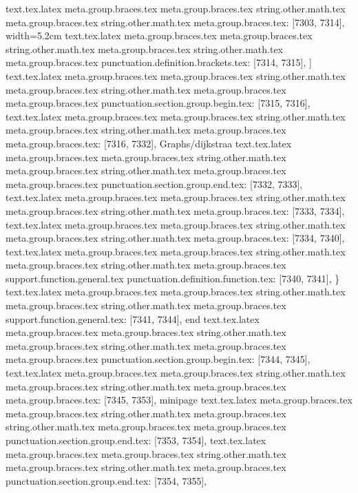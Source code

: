 {{{{{{{{{{{{{{{{{{{{{{{{{{{{{{{{{{{{{{{{{{{{{{{{{{{{{{{{{{{{{{{{{{{{{{{{{{{{{{{{{{{{{{{{{{{{{{{{{{{{{{{{{{{{{{{{{{{{{{{{{{{{{{{{{{{{{{{{{{{{{{{{{{{{{{{{{{{{{{{{{{{{{{{{{{{{{{{{{{{{{{{{{{{{{{{{{{{text.tex.latex meta.group.braces.tex meta.group.braces.tex string.other.math.tex meta.group.braces.tex string.other.math.tex meta.group.braces.tex: [7303, 7314], {width=5.2cm}
text.tex.latex meta.group.braces.tex meta.group.braces.tex string.other.math.tex meta.group.braces.tex string.other.math.tex meta.group.braces.tex punctuation.definition.brackets.tex: [7314, 7315], {]}
text.tex.latex meta.group.braces.tex meta.group.braces.tex string.other.math.tex meta.group.braces.tex string.other.math.tex meta.group.braces.tex meta.group.braces.tex punctuation.section.group.begin.tex: [7315, 7316], {{}
text.tex.latex meta.group.braces.tex meta.group.braces.tex string.other.math.tex meta.group.braces.tex string.other.math.tex meta.group.braces.tex meta.group.braces.tex: [7316, 7332], {Graphs/dijkstraa}
text.tex.latex meta.group.braces.tex meta.group.braces.tex string.other.math.tex meta.group.braces.tex string.other.math.tex meta.group.braces.tex meta.group.braces.tex punctuation.section.group.end.tex: [7332, 7333], {}}
text.tex.latex meta.group.braces.tex meta.group.braces.tex string.other.math.tex meta.group.braces.tex string.other.math.tex meta.group.braces.tex: [7333, 7334], {
}
text.tex.latex meta.group.braces.tex meta.group.braces.tex string.other.math.tex meta.group.braces.tex string.other.math.tex meta.group.braces.tex: [7334, 7340], {      }
text.tex.latex meta.group.braces.tex meta.group.braces.tex string.other.math.tex meta.group.braces.tex string.other.math.tex meta.group.braces.tex support.function.general.tex punctuation.definition.function.tex: [7340, 7341], {\}
text.tex.latex meta.group.braces.tex meta.group.braces.tex string.other.math.tex meta.group.braces.tex string.other.math.tex meta.group.braces.tex support.function.general.tex: [7341, 7344], {end}
text.tex.latex meta.group.braces.tex meta.group.braces.tex string.other.math.tex meta.group.braces.tex string.other.math.tex meta.group.braces.tex meta.group.braces.tex punctuation.section.group.begin.tex: [7344, 7345], {{}
text.tex.latex meta.group.braces.tex meta.group.braces.tex string.other.math.tex meta.group.braces.tex string.other.math.tex meta.group.braces.tex meta.group.braces.tex: [7345, 7353], {minipage}
text.tex.latex meta.group.braces.tex meta.group.braces.tex string.other.math.tex meta.group.braces.tex string.other.math.tex meta.group.braces.tex meta.group.braces.tex punctuation.section.group.end.tex: [7353, 7354], {}}
text.tex.latex meta.group.braces.tex meta.group.braces.tex string.other.math.tex meta.group.braces.tex string.other.math.tex meta.group.braces.tex punctuation.section.group.end.tex: [7354, 7355], {}}
}}}}}}}}}}}}}}}}}}}}}}}}}}}}}}}}}}}}}}}}}}}}}}}}}}}}}}}}}}}}}}}}}}}}}}}}}}}}}}}}}}}}}}}}}}}}}}}}}}}}}}}}}}}}}}}}}}}}}}}}}}}}}}}}}}}}}}}}}}}}}}}}}}}}}}}}}}}}}}}}}}}}}}}}}}}}}}}}}}}}}}}}}}}}}}}}}}}
